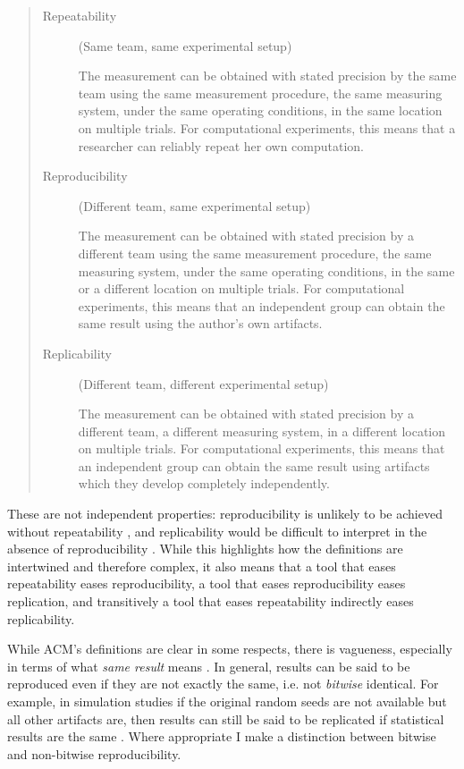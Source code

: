 \documentclass[logo,msc,dsti]{style/infthesis}    %
\begin{document}
\begin{quote}
\begin{description}
\item[Repeatability] (Same team, same experimental setup)

The measurement can be obtained with stated precision by the same team using the same measurement procedure, the same measuring system, under the same operating conditions, in the same location on multiple trials. For computational experiments, this means that a researcher can reliably repeat her own computation.
\item[Reproducibility] (Different team, same experimental setup)

The measurement can be obtained with stated precision by a different team using the same measurement procedure, the same measuring system, under the same operating conditions, in the same or a different location on multiple trials. For computational experiments, this means that an independent group can obtain the same result using the author’s own artifacts.

\item[Replicability] (Different team, different experimental setup)

The measurement can be obtained with stated precision by a different team, a different measuring system, in a different location on multiple trials. For computational experiments, this means that an independent group can obtain the same result using artifacts which they develop completely independently.
\end{description}
\end{quote}
%
These are not independent properties: reproducibility is unlikely to be achieved without repeatability \cite{hill2022reproducibility}, and replicability would be difficult to interpret in the absence of reproducibility \cite{nuijten2018verify}. While this highlights how the definitions are intertwined and therefore complex, it also means that a tool that eases repeatability eases reproducibility, a tool that eases reproducibility eases replication, and transitively a tool that eases repeatability indirectly eases replicability.

While ACM's definitions are clear in some respects, there is vagueness, especially in terms of what \emph{same result} means \cite{hill2022reproducibility}. In general, results can be said to be reproduced even if they are not exactly the same, i.e. not \emph{bitwise} identical. For example, in simulation studies if the original random seeds are not available but all other artifacts are, then results can still be said to be replicated if statistical results are the same \cite{luijken2024replicability}. Where appropriate I make a distinction between bitwise and non-bitwise reproducibility.
\end{document}
